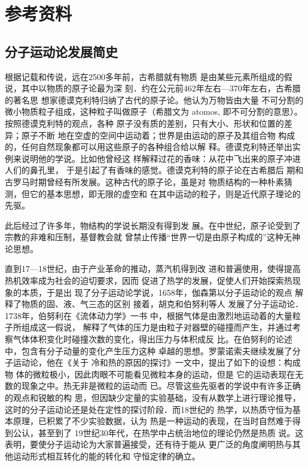 \section{参考资料}

\subsection{分子运动论发展简史}

根据记载和传说，远在2500多年前，古希腊就有物质
是由某些元素所组成的假说，其中以物质的原子论最为深
刻．约在公元前462年左右—370年左右，古希腊的著名思
想家德谟克利特归纳了古代的原子论。他认为万物皆由大量
不可分割的微小物质粒子组成，这种粒子叫做原子（希腊文为
atomos, 即不可分割的意思）。按照德谟克利特的观点，各种
原子没有质的差别，只有大小、形状和位置的差异；原子不断
地在空虚的空间中运动着；世界是由运动的原子及其组合物
构成的，任何自然现象都可以用这些原子的各种组合给以解
释。德谟克利特还举出实例来说明他的学说。比如他曾经这
样解释过花的香味：从花中飞出来的原子冲进人们的鼻孔里，
于是引起了有香味的感觉。德谟克利特的原子论在古希腊后
期和古罗马时期曾经有所发展。这种古代的原子论，虽是对
物质结构的一种朴素猜测，但它的基本思想，即无限的虚空和
在其中运动的粒子，则是近代原子理论的先驱。

此后经过了许多年，物结构的学说长期没有得到发
展。在中世纪，原子论受到了宗教的非难和压制，基督教会就
曾禁止传播“世界一切是由原子构成的”这种无神论思想。

直到17—18世纪，由于产业革命的推动，蒸汽机得到改
进和普遍使用，使得提高热机效率成为社会的迫切要求，因而
促进了热学的发展，促使人们开始探索热现象的本质，于是出
现了分子运动论学说，1658年，伽森第以分子运动论的观点
解释了物质的固、液、气三态的区别 接着，胡克和伯努利等人
发展了分子运动论．1738年，伯努利在《流体动力学》一书
中，根据气体是由激烈地运动着的大量粒子所组成这一假说，
解释了气体的压力是由粒子对器壁的碰撞而产生，并通过考
察气体体积变化时碰撞次数的变化，得出压力与体积成反
比。在伯努利的论述中，包含有分子动量的变化产生压力这种
卓越的思想。罗蒙诺索夫继续发展了分子运动论，他在《关于
冷和热的原因的探讨》一文中，提出了如下的设想：构成物
体的微粒极小，因此肉眼不可能看见微粒本身的运动，但是
它的运动表现在无数的现象之中。热无非是微粒的运动而
已。尽管这些先驱者的学说中有许多正确的观点和锐敏的构
思，但因缺少定量的实验基础，没有从数学上进行理论推导，
这时的分子运动论还是处在定性的探讨阶段．而18世纪的
热学，以热质守恒为基本原理，已积累了不少实验数据，认为
热是一种运动的表现，在当时自然难于得到公认，甚至到了
19世纪30年代，在热学中占统治地位的理论仍然是热质
说。这表明，要使分子运动论为大家普遍接受，还有待于能从
更广泛的角度阐明热与其他运动形式相互转化的能的转化和
守恒定律的确立。

